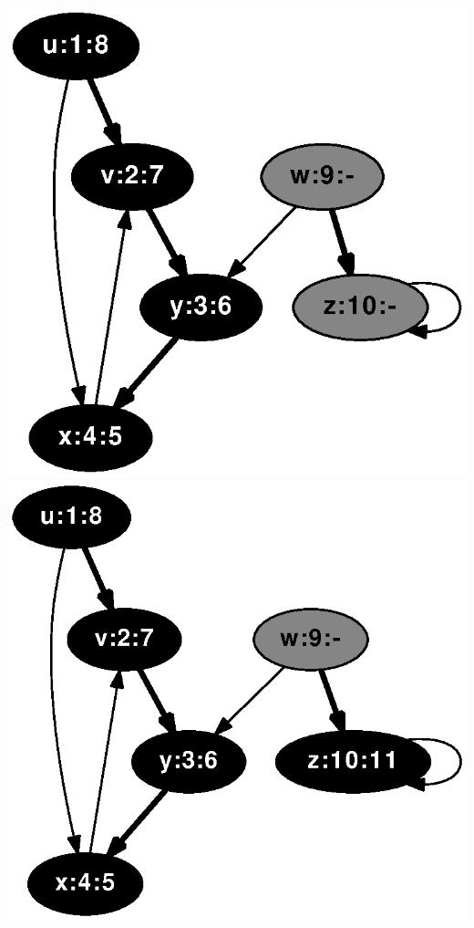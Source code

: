\documentclass{article}
\begin{document}
\includegraphics[height=.3\textheight]{clrs_example_dfs_10.eps}
\vspace{1em}
\includegraphics[height=.3\textheight]{clrs_example_dfs_11.eps}
\vspace{1em}
\end{document}
